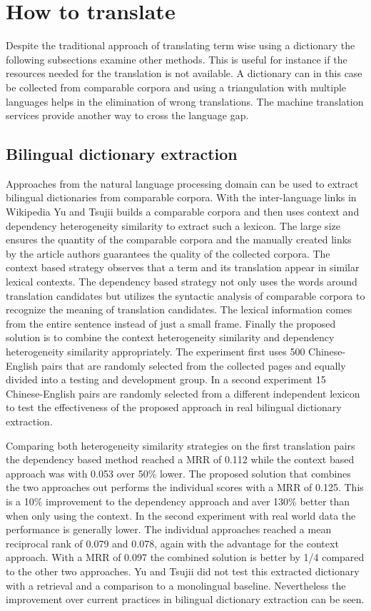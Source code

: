 \documentclass[journal]{IEEEtran}
\begin{document}
\section*{How to translate}
Despite the traditional approach of translating term wise using a dictionary the following subsections examine other methods.
This is useful for instance if the resources needed for the translation is not available.
A dictionary can in this case be collected from comparable corpora and using a triangulation with multiple languages helps in the elimination of wrong translations.
The machine translation services provide another way to cross the language gap.

\setcounter{subsection}{0}

\subsection{Bilingual dictionary extraction}
Approaches from the natural language processing domain can be used to extract bilingual dictionaries from comparable corpora.
With the inter-language links in Wikipedia Yu and Tsujii \cite{yu09} builds a comparable corpora and then uses context and dependency heterogeneity similarity to extract such a lexicon.
The large size ensures the quantity of the comparable corpora and the manually created links by the article authors guarantees the quality of the collected corpora.
The context based strategy observes that a term and its translation appear in similar lexical contexts.
The dependency based strategy not only uses the words around translation candidates but utilizes the syntactic analysis of comparable corpora to recognize the meaning of translation candidates.
The lexical information comes from the entire sentence instead of just a small frame.
Finally the proposed solution is to combine the context heterogeneity similarity and dependency heterogeneity similarity appropriately.
The experiment first uses 500 Chinese-English pairs that are randomly selected from the collected pages and equally divided into a testing and development group.
In a second experiment 15 Chinese-English pairs are randomly selected from a different independent lexicon to test the effectiveness of the proposed approach in real bilingual dictionary extraction.

Comparing both heterogeneity similarity strategies on the first translation pairs the dependency based method reached a MRR of 0.112 while the context based approach was with 0.053 over 50\% lower.
The proposed solution that combines the two approaches out performs the individual scores with a MRR of 0.125.
This is a 10\% improvement to the dependency approach and aver 130\% better than when only using the context.
In the second experiment with real world data the performance is generally lower.
The individual approaches reached a mean reciprocal rank of 0.079 and 0.078, again with the advantage for the context approach.
With a MRR of 0.097 the combined solution is better by 1/4 compared to the other two approaches.
Yu and Tsujii did not test this extracted dictionary with a retrieval and a comparison to a monolingual baseline.
Nevertheless the improvement over current practices in bilingual dictionary extraction can be seen.
\end{document}
